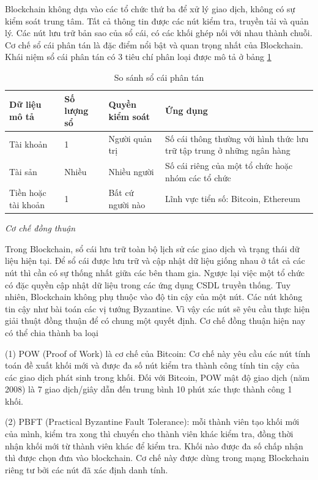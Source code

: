 Blockchain không dựa vào các tổ chức thứ ba để xử lý giao dịch, không có sự kiểm soát trung tâm.
Tất cả thông tin được các nút kiểm tra, truyền tải và quản lý. 
Các nút lưu trữ bản sao của sổ cái, có các khối ghép nối với nhau thành chuỗi.
Cơ chế sổ cái phân tán là đặc điểm nổi bật và quan trọng nhất của Blockchain.
Khái niệm sổ cái phân tán có 3 tiêu chí phân loại được mô tả ở bảng \ref{table:ex-dlt} 
\begin{table}[H]
\caption{So sánh sổ cái phân tán}
	\label{table:ex-dlt}
	\begin{tabularx} {\textwidth} {|X|p{2.3cm}|X|p{5cm}|}
\hline
	Dữ liệu mô tả & Số lượng sổ & Quyền kiểm soát & Ứng dụng \\ \hline
	Tài khoản  & 1 & Người quản trị & Số cái thông thường với hình thức lưu trữ tập trung ở những ngân hàng\\ \hline
	Tài sản   & Nhiều  &  Nhiều người & Số cái riêng của một tổ chức hoặc nhóm các tổ chức\\ \hline
	Tiền hoặc tài khoản   &  1 & Bất cứ người nào & Lĩnh vực tiển số: Bitcoin, Ethereum \\ \hline
\end{tabularx}
\end{table}

\emph{Cơ chế đồng thuận}

Trong Blockchain, sổ cái lưu trữ toàn bộ lịch sử các giao dịch và trạng thái dữ liệu hiện tại.
Để sổ cái được lưu trữ và cập nhật dữ liệu giống nhau ở tất cả các nút thì cần có sự thống nhất giữa các bên tham gia. 
Ngược lại việc một tổ chức có đặc quyền cập nhật dữ liệu trong các ứng dụng CSDL truyền thống.
Tuy nhiên, Blockchain không phụ thuộc vào độ tin cậy của một nút. Các nút không tin cậy như bài toán các vị tướng Byzantine. 
Vì vậy các nút sẽ yêu cầu thực hiện giải thuật đồng thuận để có chung một quyết định.
Cơ chế đồng thuận hiện nay có thể chia thành ba loại \cite{lequyetthang2016}

(1) POW (Proof of Work) là cơ chế của Bitcoin:
Cơ chế này yêu cầu các nút tính toán đề xuất khối mới và được đa số nút kiểm tra thành công tính tin cậy của các giao dịch phát sinh trong khối. Đối với Bitcoin, POW mật độ giao dịch (năm 2008) là 7 giao dịch/giây dẫn đến trung bình 10 phút xác thực thành công 1 khối. 

(2) PBFT (Practical Byzantine Fault Tolerance): mỗi thành viên tạo khối mới của mình, kiểm tra xong thì chuyển cho thành viên khác kiểm tra, đồng thời nhận khối mới từ thành viên khác để kiểm tra.
 Khối nào được đa số chấp nhận thì được chọn đưa vào blockchain. 
Cơ chế này được dùng trong mạng Blockchain riêng tư bởi các nút đã xác định danh tính.

